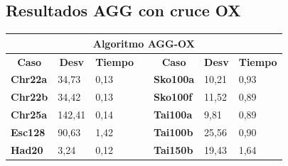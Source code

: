 \documentclass[a4paper, 12pt]{article}
\begin{document}
      \subsection{Resultados AGG con cruce OX}
      \begin{table}[H]
\centering
\label{my-label}
\begin{tabular}{|l|l|l|l|l|l|l|}
\hline
\multicolumn{7}{|c|}{\textbf{Algoritmo AGG-OX}}                                                                                                                                                                                                                   \\ \hline
\multicolumn{1}{|c|}{\textbf{Caso}} & \multicolumn{1}{c|}{\textbf{Desv}} & \multicolumn{1}{c|}{\textbf{Tiempo}} & \multicolumn{1}{c|}{\textbf{}} & \multicolumn{1}{c|}{\textbf{Caso}} & \multicolumn{1}{c|}{\textbf{Desv}} & \multicolumn{1}{c|}{\textbf{Tiempo}} \\ \cline{1-3} \cline{5-7} 
\textbf{Chr22a}                     & 34,73                              & 0,13                                 &                                & \textbf{Sko100a}                   & 10,21                              & 0,93                                 \\ \cline{1-3} \cline{5-7} 
\textbf{Chr22b}                     & 34,42                              & 0,13                                 &                                & \textbf{Sko100f}                   & 11,52                              & 0,89                                 \\ \cline{1-3} \cline{5-7} 
\textbf{Chr25a}                     & 142,41                             & 0,14                                 &                                & \textbf{Tai100a}                   & 9,81                               & 0,89                                 \\ \cline{1-3} \cline{5-7} 
\textbf{Esc128}                     & 90,63                              & 1,42                                 &                                & \textbf{Tai100b}                   & 25,56                              & 0,90                                 \\ \cline{1-3} \cline{5-7} 
\textbf{Had20}                      & 3,24                               & 0,12                                 &                                & \textbf{Tai150b}                   & 19,43                              & 1,64                                 \\ \cline{1-3} \cline{5-7} 

\end{tabular}
\end{table}
\end{document}
